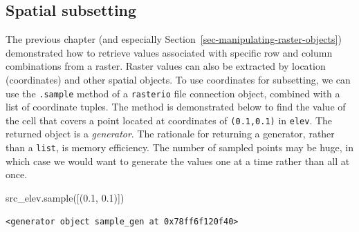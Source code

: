\documentclass[
  letterpaper,
]{krantz}
\newenvironment{Shaded}{\begin{snugshade}}{\end{snugshade}}
\newcommand{\FloatTok}[1]{\textcolor[rgb]{0.68,0.00,0.00}{#1}}
\newcommand{\NormalTok}[1]{\textcolor[rgb]{0.00,0.23,0.31}{#1}}
\begin{document}
\subsection{Spatial subsetting}\label{sec-spatial-subsetting-raster}

The previous chapter (and especially
Section~\ref{sec-manipulating-raster-objects}) demonstrated how to
retrieve values associated with specific row and column combinations
from a raster. Raster values can also be extracted by location
(coordinates) and other spatial objects. To use coordinates for
subsetting, we can use the \texttt{.sample} method of a
\texttt{rasterio} file connection object, combined with a list of
coordinate tuples. The method is demonstrated below to find the value of
the cell that covers a point located at coordinates of
\texttt{(0.1,0.1)} in \texttt{elev}. The returned object is a
\emph{generator}. The rationale for returning a generator, rather than a
\texttt{list}, is memory efficiency. The number of sampled points may be
huge, in which case we would want to generate the values one at a time
rather than all at once.

\begin{Shaded}
\begin{Highlighting}[]
\NormalTok{src\_elev.sample([(}\FloatTok{0.1}\NormalTok{, }\FloatTok{0.1}\NormalTok{)])}
\end{Highlighting}
\end{Shaded}

\begin{verbatim}
<generator object sample_gen at 0x78ff6f120f40>
\end{verbatim}
\end{document}
